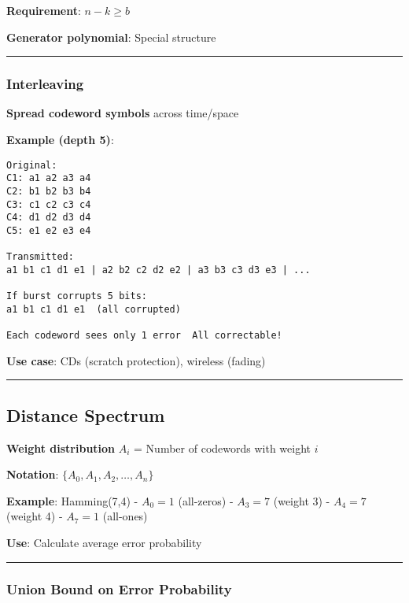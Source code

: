 \textbf{Requirement}: $n - k \geq b$

\textbf{Generator polynomial}: Special structure

\begin{center}\rule{0.5\linewidth}{0.5pt}\end{center}

\subsubsection{Interleaving}\label{interleaving}

\textbf{Spread codeword symbols} across time/space

\textbf{Example (depth 5)}:

\begin{verbatim}
Original:
C1: a1 a2 a3 a4
C2: b1 b2 b3 b4
C3: c1 c2 c3 c4
C4: d1 d2 d3 d4
C5: e1 e2 e3 e4

Transmitted:
a1 b1 c1 d1 e1 | a2 b2 c2 d2 e2 | a3 b3 c3 d3 e3 | ...

If burst corrupts 5 bits:
a1 b1 c1 d1 e1  (all corrupted)
         
Each codeword sees only 1 error  All correctable!
\end{verbatim}

\textbf{Use case}: CDs (scratch protection), wireless (fading)

\begin{center}\rule{0.5\linewidth}{0.5pt}\end{center}

\subsection{Distance Spectrum}\label{distance-spectrum}

\textbf{Weight distribution} \(A_i\) = Number of codewords with weight
\(i\)

\textbf{Notation}: \(\{A_0, A_1, A_2, \ldots, A_n\}\)

\textbf{Example}: Hamming(7,4) - \(A_0 = 1\) (all-zeros) - \(A_3 = 7\)
(weight 3) - \(A_4 = 7\) (weight 4) - \(A_7 = 1\) (all-ones)

\textbf{Use}: Calculate average error probability

\begin{center}\rule{0.5\linewidth}{0.5pt}\end{center}

\subsubsection{Union Bound on Error
Probability}\label{union-bound-on-error-probability}

